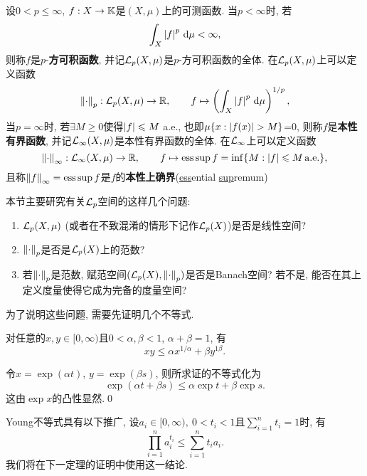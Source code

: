 	\begin{Definition}[$ \CL_p $空间]\label{def:Lp空间}
		设$ 0<p\leqslant\infty $, $ f : X\to\mathbb{K} $是$ (X,\mu) $上的可测函数. 当$ p<\infty $时, 若
		\[
		\int_X\left| f \right| ^p\,\mathrm{d}\mu<\infty,
		\]
		则称$ f $是$ p $-\textbf{方可积函数}, 并记$ \mathcal{L}_p(X,\mu) $是$ p $-方可积函数的全体. 在$ \mathcal{L}_p(X,\mu) $上可以定义函数
		\[
		\left\| \cdot \right\|_p : \mathcal{L}_p(X,\mu)\to\mathbb{R},\qquad f\mapsto\left(\int_X\left| f \right| ^p\,\mathrm{d}\mu\right)^{1/p},
		\]
		当$ p=\infty $时, 若$ \exists M\geqslant 0 $使得$ \left| f \right| \leqslant M $ a.e., 也即$ \mu\{ x : \left| f(x) \right| >M \} $=0, 则称$ f $是\textbf{本性有界函数}, 并记$ \mathcal{L}_\infty(X,\mu) $是本性有界函数的全体. 在$ \mathcal{L}_\infty $上可以定义函数
		\[
		\left\| \cdot \right\|_\infty : \mathcal{L}_\infty(X,\mu)\to\mathbb{R},\qquad f\mapsto\operatorname{ess\,sup} f=\inf\{ M : \left| f \right| \leqslant M \text{\,a.e.} \},
		\]
		且称$ \left\| f \right\|_\infty=\operatorname{ess\,sup} f $是$ f $的\textbf{本性上确界}(\underline{ess}ential \underline{sup}remum)
	\end{Definition}
	
	本节主要研究有关$ \CL_p $空间的这样几个问题:
	\begin{enumerate}[(1)]
	\item $ \mathcal{L}_p(X,\mu) $ (或者在不致混淆的情形下记作$ \mathcal{L}_p(X) $)是否是线性空间?\label{item:1.7节主要问题1}
	\item $ \left\| \cdot \right\|_p $是否是$ \mathcal{L}_p(X) $上的范数?\label{item:1.7节主要问题2}
	\item 若$ \left\| \cdot \right\|_p $是范数, 赋范空间$ (\mathcal{L}_p(X),\left\| \cdot \right\|_p) $是否是Banach空间? 若不是, 能否在其上定义度量使得它成为完备的度量空间?\label{item:1.7节主要问题3}
	\end{enumerate}
	为了说明这些问题, 需要先证明几个不等式.
	
	\begin{Lemma}[Young]
	对任意的$ x, y\in[0,\infty) $且$ 0<\alpha,\beta<1 $, $ \alpha+\beta=1 $, 有
	\[
	xy\leqslant \alpha x^{1/\alpha}+\beta y^{1\beta}.
	\]
	\end{Lemma}
	\begin{Proof}
	令$ x=\exp(\alpha t) $, $ y=\exp(\beta s) $, 则所求证的不等式化为
	\[
	\exp(\alpha t+\beta s)\leqslant\alpha\exp t+\beta\exp s.
	\]
	这由$ \exp x $的凸性显然.\qed
	\end{Proof}
	
	\begin{Remark}
	Young不等式具有以下推广, 设$ a_i\in[0,\infty),\ 0<t_i<1 $且$ \sum\limits_{i=1}^nt_i=1 $时, 有
	\[
	\prod_{i=1}^na_i^{t_i}\leqslant\sum_{i=1}^nt_ia_i.
	\]
	我们将在下一定理的证明中使用这一结论.
	\end{Remark}
	
